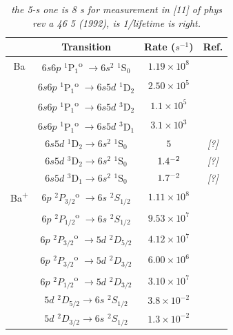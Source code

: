 \begin{table}[!htbp]
\caption{\emph{\color{red}the 5-s one is 8 s for measurement in [11] of phys rev a 46 5 (1992), is 1/lifetime is right.}} %
\label{table:BaTransitions}
\begin{tabular}{c|c|c|c}
& Transition & Rate ($s^{-1}$) & Ref. \\
\hline
Ba & $6s6p$ $^{1}$P$_{1}$\textsuperscript{o} $\rightarrow 6s^{2}$ $^{1}$S$_{0}$ & $1.19 \times 10^{8}$ & \cite{BaAllowedTransitions} \\
& $6s6p$ $^{1}$P$_{1}$\textsuperscript{o} $\rightarrow 6s5d$ $^{1}$D$_{2}$ & $2.50 \times 10^{5}$ & \cite{BaAllowedTransitions} \\
& $6s6p$ $^{1}$P$_{1}$\textsuperscript{o} $\rightarrow 6s5d$ $^{3}$D$_{2}$ & $1.1 \times 10^{5}$ & \cite{BaAllowedTransitions} \\
& $6s6p$ $^{1}$P$_{1}$\textsuperscript{o} $\rightarrow 6s5d$ $^{3}$D$_{1}$ & $3.1 \times 10^{3}$ & \cite{BaAllowedTransitions} \\
& $6s5d$ $^{1}$D$_{2} \rightarrow 6s^{2}$ $^{1}$S$_{0}$ & $5$ & \emph{\color{red}[?]} \\
& $6s5d$ $^{3}$D$_{2} \rightarrow 6s^{2}$ $^{1}$S$_{0}$ & $1.4 \time 10^{-2}$ & \emph{\color{red}[?]} \\
& $6s5d$ $^{3}$D$_{1} \rightarrow 6s^{2}$ $^{1}$S$_{0}$ & $1.7 \time 10^{-2}$ & \emph{\color{red}[?]} \\
\hline
Ba\textsuperscript{+} & $6p$ $^{2}P_{3/2}$\textsuperscript{o} $\rightarrow 6s $ $^{2}S_{1/2}$ & $1.11 \times 10^{8}$ & \cite{BaAllowedTransitions} \\
& $6p$ $^{2}P_{1/2}$\textsuperscript{o} $\rightarrow 6s$ $^{2}S_{1/2}$ & $9.53 \times 10^{7}$ & \cite{BaAllowedTransitions} \\
& $6p$ $^{2}P_{3/2}$\textsuperscript{o} $\rightarrow 5d$ $^{2}D_{5/2}$ & $4.12 \times 10^{7}$ & \cite{BaAllowedTransitions} \\
& $6p$ $^{2}P_{3/2}$\textsuperscript{o} $\rightarrow 5d$ $^{2}D_{3/2}$ & $6.00 \times 10^{6}$ & \cite{BaAllowedTransitions} \\
& $6p$ $^{2}P_{1/2}$\textsuperscript{o} $\rightarrow 5d$ $^{2}D_{3/2}$ & $3.10 \times 10^{7}$ & \cite{BaAllowedTransitions} \\
& $5d$ $^{2}D_{5/2} \rightarrow 6s$ $^{2}S_{1/2}$ & $3.8 \times 10^{-2}$ & \cite{BaPlusD52} \\
& $5d$ $^{2}D_{3/2} \rightarrow 6s$ $^{2}S_{1/2}$ & $1.3 \times 10^{-2}$ & \cite{BaPlusD32} \\
\end{tabular}
\end{table}

